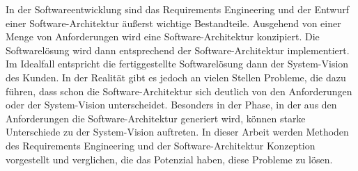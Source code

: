  In der Softwareentwicklung sind das Requirements Engineering und der Entwurf einer Software-Architektur \"au\ss{}erst wichtige Bestandteile. Ausgehend von einer Menge von Anforderungen wird eine Software-Architektur konzipiert. Die Softwarel\"osung wird dann entsprechend der Software-Architektur implementiert. Im Idealfall entspricht die fertiggestellte Softwarel\"osung dann der System-Vision des Kunden. In der Realit\"at gibt es jedoch an vielen Stellen Probleme, die dazu f\"uhren, dass schon die Software-Architektur sich deutlich von den Anforderungen oder der System-Vision unterscheidet. Besonders in der Phase, in der aus den Anforderungen die Software-Architektur generiert wird, k\"onnen starke Unterschiede zu der System-Vision auftreten. In dieser Arbeit werden Methoden des Requirements Engineering und der Software-Architektur Konzeption vorgestellt und verglichen, die das Potenzial haben, diese Probleme zu l\"osen.